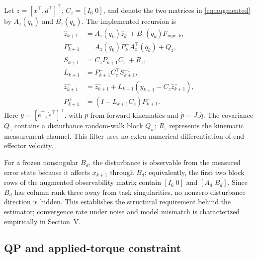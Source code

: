 \documentclass[conference]{IEEEtran}
\begin{document}
Let $z=[x^\top,d^\top]^\top$, $C_z=[I_6\;0]$, and denote the two matrices in
\eqref{eq:augmented} by $A_z(q_k)$ and $B_z(q_k)$. The implemented recursion is
\begin{subequations}
\begin{align}
\hat z^-_{k+1}&=A_z(q_k)\hat z^+_k+B_z(q_k)F_{\mathrm{mpc},k},\label{eq:kfpredict}\\
P^-_{k+1}&=A_z(q_k)P^+_kA_z^\top(q_k)+Q_z,\\
S_{k+1}&=C_zP^-_{k+1}C_z^\top+R_z,\\
L_{k+1}&=P^-_{k+1}C_z^\top S_{k+1}^{-1},\\
\hat z^+_{k+1}&=\hat z^-_{k+1}+L_{k+1}
 (y_{k+1}-C_z\hat z^-_{k+1}),\label{eq:kf}\\
P^+_{k+1}&=(I-L_{k+1}C_z)P^-_{k+1}.
\end{align}
\end{subequations}
Here $y=[e^\top,\dot e^\top]^\top$, with $p$ from forward kinematics and
$\dot p=J_v\dot q$. The covariance $Q_z$ contains a disturbance random-walk
block $Q_w$; $R_z$ represents the kinematic measurement channel. This filter
uses no extra numerical differentiation of end-effector velocity.

For a frozen nonsingular $B_d$, the disturbance is observable from the
measured error state because it affects $x_{k+1}$ through $B_d$; equivalently,
the first two block rows of the augmented observability matrix contain
$[I_6\;0]$ and $[A_d\;B_d]$. Since $B_d$ has column rank three away from task
singularities, no nonzero disturbance direction is hidden. This establishes
the structural requirement behind the estimator; convergence rate under
noise and model mismatch is characterized empirically in Section~V.

\subsection{QP and applied-torque constraint}
\end{document}
